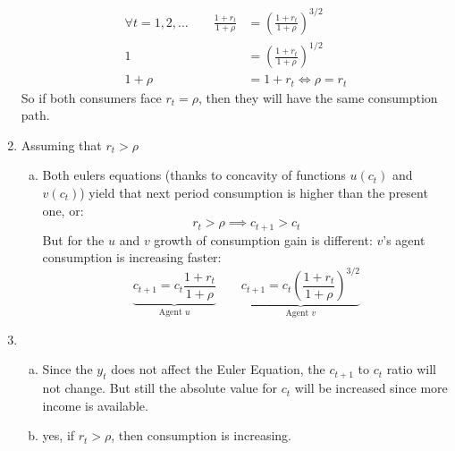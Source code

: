 \documentclass[11pt, oneside]{article}
\renewcommand{\r}{\rho}
\begin{document}
\begin{enumerate}[(1)]
	\begin{align*}
		\forall t=1, 2,\dots \quad\quad \frac{1+r_{t}}{1+\r}  &= \left(\frac{1+r_{t}}{1 + \r}\right)^{3/2} \\
		1 &= \left(\frac{1+r_{t}}{1 + \r}\right)^{1/2} \\
		1+\r &= 1 + r_{t}  \iff \r = r_{t}
	\end{align*}
So if both consumers face $ r_{t} = \r $, then they will have the same consumption path.
\item Assuming that $ r_{t} > \r $
\begin{enumerate}[(a)]
	\item Both eulers equations (thanks to concavity of functions $ u(c_{t}) $ and $ v(c_{t}) $) yield that next period consumption is higher than the present one, or:
	\[
	r_{t} > \r \implies c_{t+1} >c_{t}
	\]
	But for the $ u $ and $ v $ growth of consumption gain is different: $ v $'s agent consumption is increasing faster:
	\[
	\underbrace{c_{t+1} = c_{t}\frac{1+r_{t}}{1+\r}}_{\text{Agent } u} \quad\quad \underbrace{c_{t+1} = c_{t}\left(\frac{1+r_{t}}{1+\r}\right)^{3/2}}_{\text{Agent } v}
	\]
\end{enumerate}
\item
\begin{enumerate}[(a)]
	\item  Since the $ y_{t} $ does not affect the Euler Equation, the $ c_{t+1} $ to $ c_{t} $ ratio will not change. But still the absolute value for $ c_{t} $ will be increased since more income is available.
	\item yes, if $ r_{t} > \r $, then consumption is increasing.
\end{enumerate}

\end{enumerate}
\end{document}
